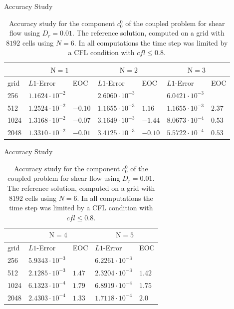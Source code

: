 \begin{frame}{Accuracy Study}
	\scriptsize
	\begin{table}[H]
		\centering
		\begin{tabular}{|l|l|l|l|l|l|l|}
			\hline 
			& \multicolumn{2}{|c|}{$\mathrm{N}=1$} & \multicolumn{2}{|c|}{$\mathrm{N}=2$} & \multicolumn{2}{|c|}{$\mathrm{N}=3$}  \\
			\hline 
			grid & $L1$-Error & EOC  & $L1$-Error & EOC  & $L1$-Error & EOC\\
			\hline
			256  & $ 1.1624 \cdot 10^{-2}$ & & $ 2.6060\cdot 10^{-3}$&&$ 6.0421 \cdot 10^{-3}$& \\
			\hline
			512 & $ 1.2524 \cdot 10^{-2}$ & $-0.10$& $1.1655  \cdot 10^{-3}$&$1.16$& $ 1.1655 \cdot 10^{-3}$& $2.37$ \\
			\hline 
			1024  &$ 1.3168 \cdot 10^{-2}$&$-0.07$& $3.1649 \cdot 10^{-3}$& $-1.44$ & $8.0673\cdot 10^{-4}$&$0.53$\\
			\hline
			2048 & $ 1.3310 \cdot 10^{-2}$ &$-0.01$& $  3.4125 \cdot 10^{-3}$&$-0.10$& $ 5.5722 \cdot 10^{-4}$&$0.53$\\
			\hline
		\end{tabular}
		\caption{Accuracy study for the component $c^0_0$ of the coupled problem for shear flow using $D_r=0.01$. The reference solution, computed on a grid with $8192$ cells using $N=6$. In all computations the time step was limited by a CFL condition with $cfl \leq 0.8$.}
		\label{tab:Dr=0.01_error_N=1,2,3vsN=6}
	\end{table}
\end{frame}


\begin{frame}{Accuracy Study}
	\scriptsize
	\begin{table}[H]
		\centering
		\begin{tabular}{|l|l|l|l|l|}
			\hline 
			& \multicolumn{2}{|c|}{$\mathrm{N}=4$} & \multicolumn{2}{|c|}{$\mathrm{N}=5$}   \\
			\hline 
			grid & $L1$-Error & EOC  & $L1$-Error & EOC  \\
			\hline
			256  & $5.9343\cdot 10^{-3}$ & & $ 6.2261\cdot 10^{-3}$& \\
			\hline
			512 & $ 2.1285 \cdot 10^{-3}$ & $1.47$ & $2.3204  \cdot 10^{-3}$&$1.42$ \\
			\hline 
			1024  &$ 6.1323\cdot 10^{-4}$&$1.79$& $ 6.8919 \cdot 10^{-4}$& $1.75$ \\
			\hline
			2048 & $ 2.4303 \cdot 10^{-4}$ &$1.33$& $ 1.7118 \cdot 10^{-4}$&$2.0$\\
			\hline
		\end{tabular}
		\caption{Accuracy study for the component $c^0_0$ of the coupled problem for shear flow using $D_r=0.01$. The reference solution, computed on a grid with $8192$ cells using $N=6$. In all computations the time step was limited by a CFL condition with $cfl \leq 0.8$.}
		\label{tab:Dr=0.01_error_N=4,5vsN=6}
	\end{table}
\end{frame}


